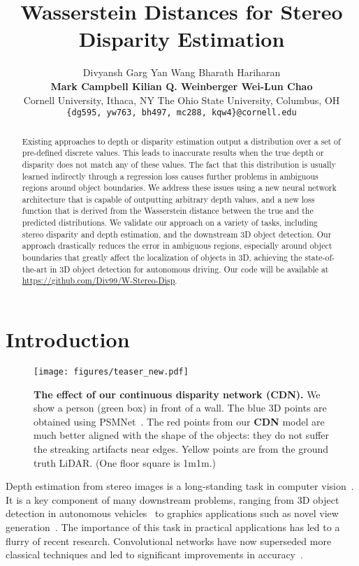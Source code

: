 \documentclass{article}
\title{Wasserstein Distances for Stereo Disparity Estimation}
\author{Divyansh Garg \hspace{10pt}Yan Wang
	\hspace{10pt}Bharath Hariharan \\ 
	\textbf{Mark Campbell \hspace{10pt}Kilian Q. Weinberger \hspace{10pt}Wei-Lun Chao}\\
	Cornell University, Ithaca, NY \hspace{20pt}The Ohio State University, Columbus, OH\\
	{\tt\small \{dg595, yw763, bh497, mc288, kqw4\}@cornell.edu}
	\hspace{20pt}{\tt\small chao.209@osu.edu}
}
\begin{document}
\maketitle

\begin{abstract}
Existing approaches to depth or disparity estimation output a distribution over a set of pre-defined discrete values. 
This leads to inaccurate results when the true depth or disparity does not match any of these values.
The fact that this distribution is usually learned indirectly through a regression loss causes further problems in ambiguous regions around object boundaries.
We address these issues using a new neural network architecture that is capable of outputting arbitrary depth values, and a new loss function that is derived from the Wasserstein distance between the true and the predicted distributions.
We validate our approach on a variety of tasks, including stereo disparity and depth estimation, and the downstream 3D object detection. Our approach drastically reduces the error in ambiguous regions, especially around object boundaries that greatly affect the localization of objects in 3D, achieving the state-of-the-art in 3D object detection for autonomous driving.
Our code will be available at \url{https://github.com/Div99/W-Stereo-Disp}.
\end{abstract}
 \section{Introduction}
\label{sec: intro}

\begin{wrapfigure}{r}{0.5\textwidth}
		\vspace{-32pt}
		\texttt{[image: figures/teaser\_new.pdf]}
		\vspace{-10pt}
		\caption{\textbf{The effect of our continuous disparity network (CDN).} We show a person (green box) in front of a wall. The blue 3D points are obtained using PSMNet~\cite{chang2018pyramid}. The red points from our \textbf{CDN} model are much better aligned with the shape of the objects: they do not suffer the streaking artifacts near edges. Yellow points are from the ground truth LiDAR. (One floor square is 1m1m.) \label{fig:teaser}}
		\vskip -10pt
\end{wrapfigure}

Depth estimation from stereo images is a long-standing task in computer vision~\cite{scharstein2003high,papandreou2017towards}.
It is a key component of many downstream problems, ranging from 3D object detection in autonomous vehicles~\cite{pseudoLiDAR,you2019pseudo,chen2020dsgn,li2019stereo,qian2020end} to graphics applications such as novel view generation~\cite{yu2019depth,liu2018geometry}.
The importance of this task in practical applications has led to a flurry of recent research.
Convolutional networks have now superseded more classical techniques and led to significant improvements in accuracy~\cite{wang2018anytime,chang2018pyramid,mayer2016large,zhang2019ga}.
\end{document}
